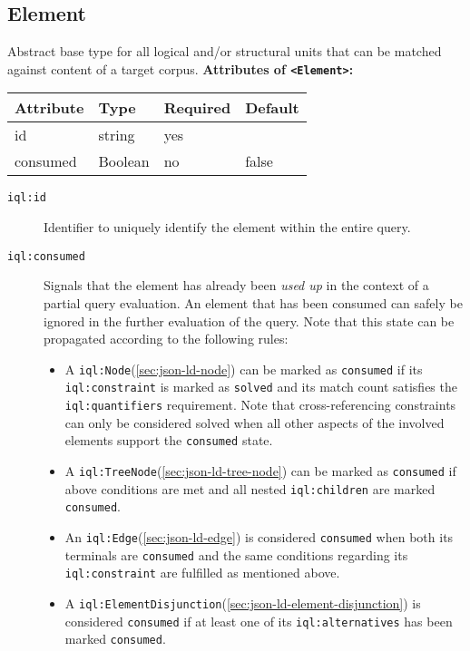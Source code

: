 \documentclass[11pt,a4paper,portrait]{article}
\newcommand{\compresslist}{ %
	\setlength{\topsep}{0pt}
	\setlength{\itemsep}{1pt}
	\setlength{\parskip}{0pt}
	\setlength{\parsep}{0pt}
}
\newcommand{\iqlns}{iql:}
\newcommand{\iqlType}[1]{\texttt{\iqlns#1}}
\newcommand{\iqlBaseType}[1]{\texttt{\textless#1\textgreater}}
\newcommand{\desc}[1]{\noindent#1\newline\medskip}
\newenvironment{attributes}[1]{
\noindent\textbf{Attributes of #1:}\newline\medskip
\begin{tabular}{|p{0.3\textwidth}|p{0.20\textwidth}|p{0.20\textwidth}|p{0.17\textwidth}|}
	\hline
	\textbf{Attribute} & \textbf{Type} & \textbf{Required} & \textbf{Default} \\ 
	\hline
	\hline
}{
\end{tabular}
}
\newcommand{\attribute}[4]{
	#1 & #2 & #3 & #4 \\
	\hline
}
\begin{document}
\subsection{Element}
\label{sec:json-ld-element}
\desc{Abstract base type for all logical and/or structural units that can be matched against content of a target corpus.}
\begin{attributes}{\iqlBaseType{Element}}
	\attribute{id}{string}{yes}{}
	\attribute{consumed}{Boolean}{no}{false}
\end{attributes}
\begin{description}
	\item[\iqlType{id}] Identifier to uniquely identify the element within the entire query.
	\item[\iqlType{consumed}] Signals that the element has already been \textit{used up} in the context of a partial query evaluation. An element that has been consumed can safely be ignored in the further evaluation of the query. Note that this state can be propagated according to the following rules:
	\begin{itemize}[leftmargin=*,topsep=0pt]\compresslist
		\item A \iqlType{Node}(\ref{sec:json-ld-node}) can be marked as \texttt{consumed} if its \iqlType{constraint} is marked as \texttt{solved} and its match count satisfies the \iqlType{quantifiers} requirement. Note that cross-referencing constraints can only be considered solved when all other aspects of the involved elements support the \texttt{consumed} state.
		\item A \iqlType{TreeNode}(\ref{sec:json-ld-tree-node}) can be marked as \texttt{consumed} if above conditions are met and all nested \iqlType{children} are marked \texttt{consumed}.
		\item An \iqlType{Edge}(\ref{sec:json-ld-edge}) is considered \texttt{consumed} when both its terminals are \texttt{consumed} and the same conditions regarding its \iqlType{constraint} are fulfilled as mentioned above.
		\item A \iqlType{ElementDisjunction}(\ref{sec:json-ld-element-disjunction}) is considered \texttt{consumed} if at least one of its \iqlType{alternatives} has been marked \texttt{consumed}.
	\end{itemize}
\end{description}
\end{document}
